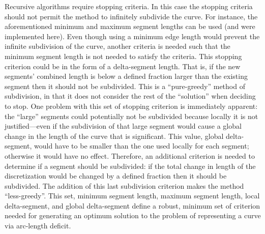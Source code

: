Recursive algorithms require stopping criteria.  In this case the stopping criteria should not permit the method to infinitely subdivide the curve.  For instance, the aforementioned minimum and maximum segment lengths can be used (and were implemented here).  Even though using a minimum edge length would prevent the infinite subdivision of the curve, another criteria is needed such that the minimum segment length is not needed to satisfy the criteria.  This stopping criterion could be in the form of a delta-segment length.  That is, if the new segments’ combined length is below a defined fraction larger than the existing segment then it should not be subdivided.  This is a ``pure-greedy'' method of subdivision, in that it does not consider the rest of the ``solution'' when deciding to stop.  One problem with this set of stopping criterion is immediately apparent: the ``large'' segments could potentially not be subdivided because locally it is not justified—even if the subdivision of that large segment would cause a global change in the length of the curve that is significant.  This value, global delta-segment, would have to be smaller than the one used locally for each segment; otherwise it would have no effect.  Therefore, an additional criterion is needed to determine if a segment should be subdivided: if the total change in length of the discretization would be changed by a defined fraction then it should be subdivided.  The addition of this last subdivision criterion makes the method ``less-greedy''.  This set, minimum segment length, maximum segment length, local delta-segment, and global delta-segment define a robust, minimum set of criterion needed for generating an optimum solution to the problem of representing a curve via arc-length deficit.

